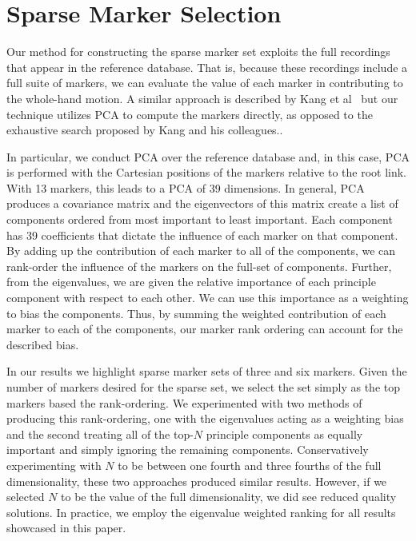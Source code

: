 
\section{Sparse Marker Selection}
Our method for constructing the sparse marker set exploits the full recordings
that appear in the reference database.  That is, because these recordings 
include a full suite of markers, we can evaluate the value of each marker
in contributing to the whole-hand motion.  A similar approach is described
by Kang et al~\cite{Kang12} but our technique utilizes PCA to compute the markers
directly, as opposed to the exhaustive search proposed by Kang and his
colleagues..

In particular, we conduct PCA over the reference database and, in this case,
PCA is performed with the Cartesian positions of the markers relative
to the root link.  With 13 markers, this leads to a PCA of 39 dimensions.  
In general, PCA produces a covariance matrix and the eigenvectors of this matrix 
create a list of components ordered from most important
to least important.  
%
Each component has 39 coefficients that dictate the influence of each 
marker on that component.  By adding up the contribution of each marker
to all of the components, we can rank-order the influence of the markers on the
full-set of components.  Further, from the eigenvalues, we are given the relative importance
of each principle component with respect to each other.  We can use this importance
as a weighting to bias the components.  Thus, by summing the weighted contribution
of each marker to each of the components, our marker rank ordering can account
for the described bias.


In our results we highlight sparse marker sets of three 
and six markers.
Given the number of markers desired for the sparse set, we select the
set simply as the top markers based the rank-ordering.  We experimented with two methods of
producing this rank-ordering, one with the eigenvalues acting as a weighting bias
and the second treating all of the top-$N$ principle components as equally important and simply
ignoring the remaining components.  Conservatively experimenting with $N$ to be 
between one fourth and three fourths of the full dimensionality, these two approaches 
produced similar results.   However, if we selected $N$ to be the value of the full dimensionality,
we did see reduced quality solutions.  In practice, we employ the eigenvalue weighted ranking for
all results showcased in this paper.  

